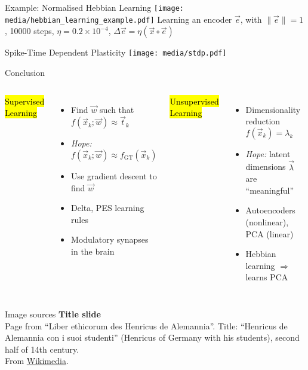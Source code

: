 \documentclass[handout,aspectratio=169]{beamer}
\begin{document}
	\begin{frame}{Example: Normalised Hebbian Learning}
		\centering
		\texttt{[image: media/hebbian\_learning\_example.pdf]}
		Learning an encoder $\vec e$, with $\| \vec e \| = 1$, 10000 steps, $\eta = 0.2 \times 10^{-4}$, $\Delta \vec e = \eta (\vec x \circ \vec e)$
	\end{frame}

	\begin{frame}{Spike-Time Dependent Plasticity}
        \centering
		\texttt{[image: media/stdp.pdf]}
	\end{frame}

	\begin{frame}{Conclusion}
		\begin{columns}[T]
			{\centering
			\hl{Supervised Learning}\\[0.25cm]}
			\begin{itemize}
				\setlength{\itemsep}{0.3cm}
				\item Find $\vec w$ such that $f(\vec x_k; \vec w) \approx \vec t_k$
				\item \emph{Hope:} $f(\vec x_k; \vec w) \approx f_\mathrm{GT}(\vec x_k)$
				\item Use gradient descent to find $\vec w$
				\item Delta, PES learning rules
				\item Modulatory synapses in the brain
			\end{itemize}
			{\centering
			\hl{Unsupervised Learning}\\[0.25cm]}
			\begin{itemize}
				\setlength{\itemsep}{0.25cm}
				\item Dimensionality reduction $f(\vec x_k) = \lambda_k$
				\item \emph{Hope:} latent dimensions $\vec \lambda$ are \enquote{meaningful}
				\item Autoencoders (nonlinear),\\PCA (linear)
				\item Hebbian learning $\Rightarrow$ learns PCA
			\end{itemize}
		\end{columns}
	\end{frame}

	\backupbegin

	\begin{frame}[noframenumbering]{Image sources}
		\small
		\textbf{Title slide}\\Page from \enquote{Liber ethicorum des Henricus de Alemannia}. Title: \enquote{Henricus de Alemannia con i suoi studenti} (Henricus of Germany with his students), second half of 14th century.\\From \href{https://commons.wikimedia.org/wiki/File:Laurentius_de_Voltolina_001.jpg}{Wikimedia}.
	\end{frame}

	\backupend
	
\end{document}
